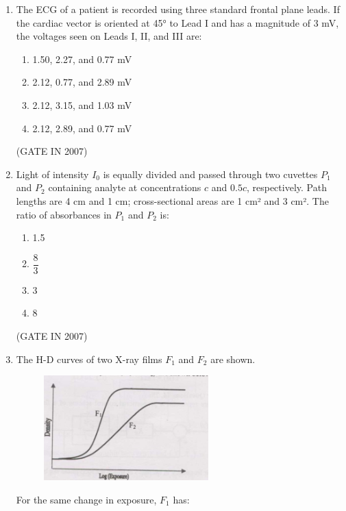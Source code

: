 \documentclass[journal]{IEEEtran}
\begin{document}
\begin{enumerate}
\begin{multicols}{4}
\begin{enumerate}
    \item 10 and 100
    \item 100 and 10
    \item 10 and 10
    \item $\infty$ and $\infty$
\end{enumerate}
\end{multicols}
\hfill(GATE IN 2007)

\item The ECG of a patient is recorded using three standard frontal plane leads. If the cardiac vector is oriented at 45° to Lead I and has a magnitude of 3 mV, the voltages seen on Leads I, II, and III are:

\begin{multicols}{2}
\begin{enumerate}
    \item 1.50, 2.27, and 0.77 mV
    \item 2.12, 0.77, and 2.89 mV
    \item 2.12, 3.15, and 1.03 mV
    \item 2.12, 2.89, and 0.77 mV
\end{enumerate}
\end{multicols}
\hfill(GATE IN 2007)

\item Light of intensity $I_0$ is equally divided and passed through two cuvettes $P_1$ and $P_2$ containing analyte at concentrations $c$ and $0.5c$, respectively. Path lengths are 4 cm and 1 cm; cross-sectional areas are 1 cm² and 3 cm². The ratio of absorbances in $P_1$ and $P_2$ is:

\begin{multicols}{4}
\begin{enumerate}
    \item 1.5
    \item $\dfrac{8}{3}$
    \item 3
    \item 8
\end{enumerate}
\end{multicols}
\hfill(GATE IN 2007)

\item The H-D curves of two X-ray films $F_1$ and $F_2$ are shown. 
\begin{figure}[H]
    \centering
      \includegraphics[width=0.6\textwidth]{59.jpg} 
      \caption{}
    \label{fig:fig59} 
\end{figure}
For the same change in exposure, $F_1$ has:



\end{enumerate}
\end{document}
